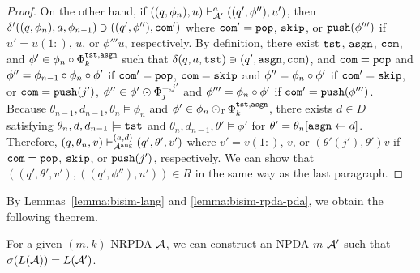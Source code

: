\begin{proof}
On the other hand,
if $((q,\phi_n),u)\vdash_{{\cal A}'}^a ((q',\phi''),u')$, then
$\delta'((q,\phi_n),a,\allowbreak
\phi_{n-1})\ni ((q',\phi''),\mathtt{com}')$
where
$\mathtt{com}'=\mathtt{pop}$, $\mathtt{skip}$, or $\mathtt{push}(\phi''')$ if
$u'=u(1{:})$, $u$, or $\phi'''u$, respectively.
By definition,
there exist $\mathtt{tst}$, $\mathtt{asgn}$, $\mathtt{com}$, and
$\phi'\in\phi_n\circ\Phi_k^{\mathtt{tst},\mathtt{asgn}}$ such that
$\delta(q,a,\mathtt{tst})\ni(q',\mathtt{asgn},\mathtt{com})$, and
$\mathtt{com}=\mathtt{pop}$ and $\phi''=\phi_{n-1}\circ\phi_n\circ\phi'$
if $\mathtt{com}'=\mathtt{pop}$,
$\mathtt{com}=\mathtt{skip}$ and $\phi''=\phi_n\circ\phi'$ if $\mathtt{com}'=\mathtt{skip}$,
or
$\mathtt{com}=\mathtt{push}(j')$, $\phi''\in\phi'\odot\Phi_j^{=,j'}$
and $\phi'''=\phi_n\circ\phi'$ if $\mathtt{com}'=\mathtt{push}(\phi''')$.
Because $\theta_{n-1},d_{n-1},\theta_n\models\phi_n$ and
$\phi'\in\phi_n\odot_{\mathtt{T}}\Phi_k^{\mathtt{tst},\mathtt{asgn}}$,
there exists $d\in D$ satisfying
$\theta_n,d,d_{n-1}\models\mathtt{tst}$ and
$\theta_n,d_{n-1},\theta'\models\phi'$
for $\theta'=\theta_n[\mathtt{asgn}\gets d]$.
Therefore,
$(q,\theta_n,v)\vdash_{{\cal A}^{\mathrm{aug}}}^{(a,d)} (q',\theta',v')$
where
$v'=v(1{:})$, $v$, or
$(\theta'(j'),\theta')v$
if $\mathtt{com}=\mathtt{pop}$, $\mathtt{skip}$, or $\mathtt{push}(j')$, respectively.
We can show that $((q',\theta',v'),((q',\phi''),u'))\in R$
in the same way as the last paragraph.
\end{proof}

By Lemmas~\ref{lemma:bisim-lang} and \ref{lemma:bisim-rpda-pda},
we obtain the following theorem.
\begin{theorem}
\label{the: RPDAtoPDA}
For a given $(m,k)$-NRPDA ${\cal A}$, we can construct an NPDA $m$-${\cal A}'$
such that $\sigma(L({\cal A}))=L({\cal A}')$.
\end{theorem}
